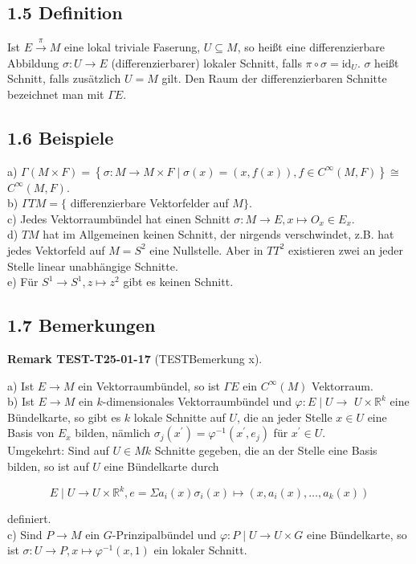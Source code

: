 \documentclass[10pt, letterpaper]{article}
\newcommand{\CustomHeading}[3]{%
  \par\medskip\noindent%
  \textbf{#1 #2} \textnormal{(#3)}.\enskip%
}
\newenvironment{REM}[2]{\begin{unitbox}\CustomHeading{Remark}{#1}{#2}}{\end{unitbox}}
\begin{document}
\subsection*{1.5 Definition}
Ist $E \xrightarrow{\pi} M$ eine lokal triviale Faserung, $U \subseteq M$, so heißt eine differenzierbare Abbildung $\sigma: U \rightarrow E$ (differenzierbarer) lokaler Schnitt, falls $\pi \circ \sigma=\mathrm{id}_{U}$. $\sigma$ heißt Schnitt, falls zusätzlich $U=M$ gilt. Den Raum der differenzierbaren Schnitte bezeichnet man mit $\Gamma E$.

\subsection*{1.6 Beispiele}
a) $\Gamma(M \times F)=\left\{\sigma: M \rightarrow M \times F \mid \sigma(x)=(x, f(x)), f \in C^{\infty}(M, F)\right\} \cong$ $C^{\infty}(M, F)$.\\
b) $\Gamma T M=\{$ differenzierbare Vektorfelder auf $M\}$.\\
c) Jedes Vektorraumbündel hat einen Schnitt $\sigma: M \rightarrow E, x \mapsto O_{x} \in E_{x}$.\\
d) $T M$ hat im Allgemeinen keinen Schnitt, der nirgends verschwindet, z.B. hat jedes Vektorfeld auf $M=S^{2}$ eine Nullstelle. Aber in $T T^{2}$ existieren zwei an jeder Stelle linear unabhängige Schnitte.\\
e) Für $S^{1} \rightarrow S^{1}, z \mapsto z^{2}$ gibt es keinen Schnitt.

\subsection*{1.7 Bemerkungen}
\begin{REM}{TEST-T25-01-17}{TESTBemerkung x}
a) Ist $E \rightarrow M$ ein Vektorraumbündel, so ist $\Gamma E$ ein $C^{\infty}(M)$ Vektorraum.\\
b) Ist $E \rightarrow M$ ein $k$-dimensionales Vektorraumbündel und $\varphi: E \mid U \rightarrow$ $U \times \mathbb{R}^{k}$ eine Bündelkarte, so gibt es $k$ lokale Schnitte auf $U$, die an jeder Stelle $x \in U$ eine Basis von $E_{x}$ bilden, nämlich $\sigma_{j}\left(x^{\prime}\right)=\varphi^{-1}\left(x^{\prime}, e_{j}\right)$ für $x^{\prime} \in U$.\\
Umgekehrt: Sind auf $U \in M k$ Schnitte gegeben, die an der Stelle eine Basis bilden, so ist auf $U$ eine Bündelkarte durch

$$
E \mid U \rightarrow U \times \mathbb{R}^{k}, e=\Sigma a_{i}(x) \sigma_{i}(x) \mapsto\left(x, a_{i}(x), \ldots, a_{k}(x)\right)
$$

definiert.\\
c) Sind $P \rightarrow M$ ein $G$-Prinzipalbündel und $\varphi: P \mid U \rightarrow U \times G$ eine Bündelkarte, so ist $\sigma: U \rightarrow P, x \mapsto \varphi^{-1}(x, 1)$ ein lokaler Schnitt.
\end{REM}
\end{document}
